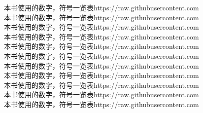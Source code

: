 {\cjk\mktsFontfileSourcecodeprolight{}本书使用的数字，符号一览表https://raw.githubusercontent.com}\\
{\cjk\mktsFontfileSourcecodepromedium{}本书使用的数字，符号一览表https://raw.githubusercontent.com}\\
{\cjk\mktsFontfileSourcecodeproregular{}本书使用的数字，符号一览表https://raw.githubusercontent.com}\\
{\cjk\mktsFontfileSourcecodeprosemibold{}本书使用的数字，符号一览表https://raw.githubusercontent.com}\\
{\cjk\mktsFontfileOptima{}本书使用的数字，符号一览表https://raw.githubusercontent.com}\\
{\cjk\mktsFontfilePtsans{}本书使用的数字，符号一览表https://raw.githubusercontent.com}\\
{\cjk\mktsFontfileKai{}本书使用的数字，符号一览表https://raw.githubusercontent.com}\\
{\cjk\mktsFontfileNanumgothic{}本书使用的数字，符号一览表https://raw.githubusercontent.com}\\
{\cjk\mktsFontfileNanummyeongjo{}本书使用的数字，符号一览表https://raw.githubusercontent.com}\\
{\cjk\mktsFontfileJizurathreeb{}本书使用的数字，符号一览表https://raw.githubusercontent.com}\\
{\cjk\mktsFontfileBiaukai{}本书使用的数字，符号一览表https://raw.githubusercontent.com}\\


